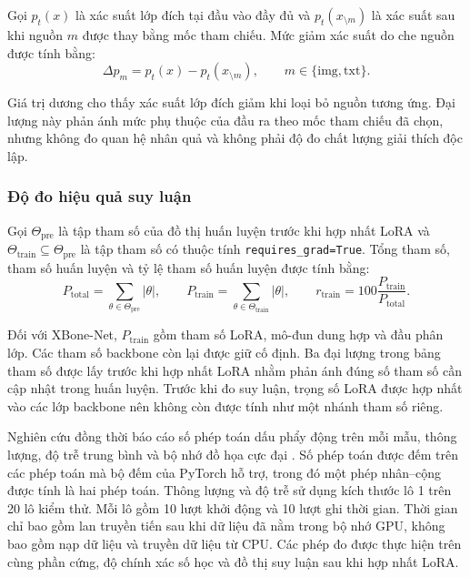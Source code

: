 Gọi $p_t(x)$ là xác suất lớp đích tại đầu vào đầy đủ và $p_t(x_{\setminus m})$ là xác suất sau khi nguồn $m$ được thay bằng mốc tham chiếu. Mức giảm xác suất do che nguồn được tính bằng:
\begin{equation}
\Delta p_m=p_t(x)-p_t(x_{\setminus m}),
\qquad m\in\{\mathrm{img},\mathrm{txt}\}.
\label{eq:ch4_source_probability_drop}
\end{equation}

Giá trị dương cho thấy xác suất lớp đích giảm khi loại bỏ nguồn tương ứng. Đại lượng này phản ánh mức phụ thuộc của đầu ra theo mốc tham chiếu đã chọn, nhưng không đo quan hệ nhân quả và không phải độ đo chất lượng giải thích độc lập.

\subsubsection{Độ đo hiệu quả suy luận}

Gọi $\Theta_{\mathrm{pre}}$ là tập tham số của đồ thị huấn luyện trước khi hợp nhất LoRA và $\Theta_{\mathrm{train}}\subseteq\Theta_{\mathrm{pre}}$ là tập tham số có thuộc tính \texttt{requires\_grad=True}. Tổng tham số, tham số huấn luyện và tỷ lệ tham số huấn luyện được tính bằng:
\begin{equation}
P_{\mathrm{total}}=\sum_{\theta\in\Theta_{\mathrm{pre}}}|\theta|,
\qquad
P_{\mathrm{train}}=\sum_{\theta\in\Theta_{\mathrm{train}}}|\theta|,
\qquad
r_{\mathrm{train}}=100\frac{P_{\mathrm{train}}}{P_{\mathrm{total}}}.
\label{eq:ch4_trainable_parameter_ratio}
\end{equation}

Đối với XBone-Net, $P_{\mathrm{train}}$ gồm tham số LoRA, mô-đun dung hợp và đầu phân lớp. Các tham số backbone còn lại được giữ cố định. Ba đại lượng trong bảng tham số được lấy trước khi hợp nhất LoRA nhằm phản ánh đúng số tham số cần cập nhật trong huấn luyện. Trước khi đo suy luận, trọng số LoRA được hợp nhất vào các lớp backbone nên không còn được tính như một nhánh tham số riêng.

Nghiên cứu đồng thời báo cáo số phép toán dấu phẩy động trên mỗi mẫu, thông lượng, độ trễ trung bình và bộ nhớ đồ họa cực đại \cite{Canziani2017PracticalDNN,Reddi2020MLPerfInference}. Số phép toán được đếm trên các phép toán mà bộ đếm của PyTorch hỗ trợ, trong đó một phép nhân--cộng được tính là hai phép toán. Thông lượng và độ trễ sử dụng kích thước lô 1 trên 20 lô kiểm thử. Mỗi lô gồm 10 lượt khởi động và 10 lượt ghi thời gian. Thời gian chỉ bao gồm lan truyền tiến sau khi dữ liệu đã nằm trong bộ nhớ GPU, không bao gồm nạp dữ liệu và truyền dữ liệu từ CPU. Các phép đo được thực hiện trên cùng phần cứng, độ chính xác số học và đồ thị suy luận sau khi hợp nhất LoRA.

